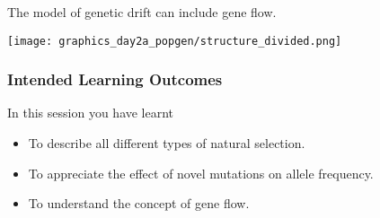 \documentclass{beamer}
\newcommand{\1}{\ensuremath{\mathbf{1}}}
\begin{document}
%
%
%
\begin{frame}
	The model of genetic drift can include gene flow.
	\begin{center}
		\texttt{[image: graphics\_day2a\_popgen/structure\_divided.png]}
	\end{center}
\end{frame}
%
%
%
\begin{frame}\frametitle{Intended Learning Outcomes}
	In this session you have learnt
	\begin{itemize}
		\item To describe all different types of natural selection.
		\item To appreciate the effect of novel mutations on allele frequency.
		\item To understand the concept of gene flow.
	\end{itemize}
\end{frame}
%
%
%
\end{document}
